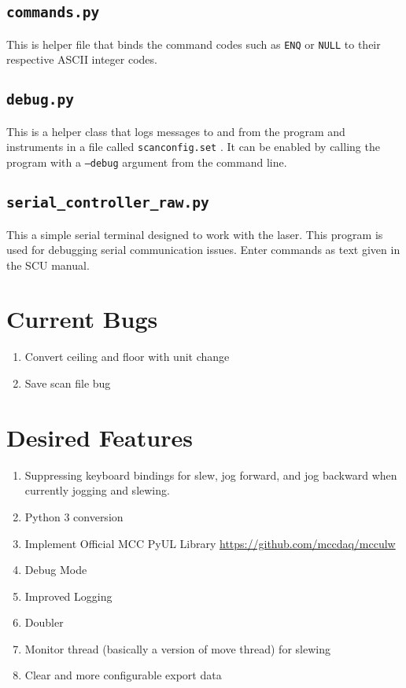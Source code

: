 \documentclass[11pt]{article}
\begin{document}
\subsection{\texttt{commands.py}}
This is helper file that binds the command codes such as \texttt{ENQ} or \texttt{NULL} to their respective ASCII integer codes.
\subsection{\texttt{debug.py}}
This is a helper class that logs messages to and from the program and instruments in a file called \texttt{scan\textunderscore config.set} . It can be enabled by calling the program with a \texttt{--debug} argument from the command line.
\subsection{\texttt{serial\_controller\_raw.py}}
This a simple serial terminal designed to work with the laser. This program is used for debugging serial communication issues. Enter commands as text given in the SCU manual.
\section{Current Bugs}
\begin{enumerate}
    \item Convert ceiling and floor with unit change
    \item Save scan file bug 
\end{enumerate}
\section{Desired Features}
\begin{enumerate}
    \item Suppressing keyboard bindings for slew, jog forward, and jog backward when currently jogging and slewing.
    \item Python 3 conversion 
    \item Implement Official MCC PyUL Library \url{https://github.com/mccdaq/mcculw}
    \item Debug Mode
    \item Improved Logging 
    \item Doubler 
    \item Monitor thread (basically a version of move thread) for slewing
    \item Clear and more configurable export data
\end{enumerate}
\end{document}
